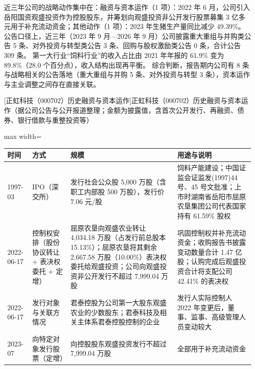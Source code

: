  近三年公司的战略动作集中在：融资与资本运作（1 项）：2022 年 6 月，公司引入岳阳国资观盛投资作为控股股东，并筹划向观盛投资非公开发行股票募集 3 亿多元用于补充流动资金；其他动作（1 项）：2023 年生猪生产量同比减少 49.39\%。 公告口径上，近三年（2023 年 9 月---2026 年 9 月）公司披露重大重组与并购类公告 5 条、对外投资与转型类公告 3 条、回购与股权激励类公告 0 条，合计公告 309 条。 第一大行业“饲料行业”的收入占比由 2021 年年报的 61.9\% 变为 89.8\%（28.0 个百分点），收入结构出现再平衡。 综合判断，报告期内公司有 8 条与战略相关的公告落地（重大重组与并购 5 条、对外投资与转型 3 条），资本运作与主业调整之间存在直接关联。

\begin{center}\small\setlength{\tabcolsep}{4pt}
[正虹科技（000702）历史融资与资本运作]{正虹科技（000702）历史融资与资本运作（据公司公告与公开报道整理；金额为披露值，含首次公开发行、再融资、债券、银行借款与重整投资等）}
\begin{adjustbox}{max width=\textwidth}
\begin{tabular}{@{}p{1.45cm}p{2.55cm}p{4.05cm}p{4.95cm}@{}}
\toprule
时间 & 方式 & 规模 & 用途与说明 \\
\midrule
1997-03 & IPO（深交所） & 发行社会公众股 5,\allowbreak{}000 万股（含职工内部股 500 万股），\allowbreak{}发行价 7.06 元/\allowbreak{}股 & 饲料产能建设；中国证监会证监发(1997)44 号、\allowbreak{}45 号文批准；上市时湖南省岳阳市屈原农垦集团公司代表国家持有 61.59\% 股权 \\
2022-06-17 & 控制权安排（股份协议转让 + 表决权委托 + 定增） & 屈原农垦向观盛农业转让 4,\allowbreak{}034.18 万股（占发行前总股本 15.13\%）；屈原农垦将其剩余 2,\allowbreak{}667.58 万股（10.00\%）表决权委托给观盛投资；公司向观盛投资非公开发行不超过 7,\allowbreak{}999.04 万股 & 巩固控制权并补充流动资金；收购报告书披露变动数量合计 1.47 亿股；认购完成后观盛投资合计将支配公司 42.41\% 的表决权 \\
2022-06-17 & 发行对象与关联方情况 & 君泰控股为公司第一大股东观盛农业的少数股东；君泰科技及相关主体系君泰控股控制的企业 & 发行人实际控制人 2022 年变更后，\allowbreak{}董事、\allowbreak{}监事、\allowbreak{}高级管理人员变动较大 \\
2023-07 & 向特定对象发行股票（定增） & 向控股股东观盛投资发行不超过 7,\allowbreak{}999.04 万股 & 全部用于补充流动资金 \\
\bottomrule
\end{tabular}
\end{adjustbox}
\end{center}

